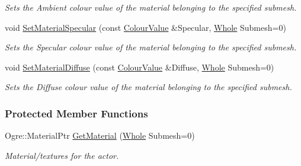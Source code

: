 \begin{DoxyCompactItemize}
\begin{DoxyCompactList}\small\item\em Sets the Ambient colour value of the material belonging to the specified submesh. \item\end{DoxyCompactList}\item 
void \hyperlink{classphys_1_1ActorGraphicsSettings_a51bfae72380679093595c1805b1d940b}{SetMaterialSpecular} (const \hyperlink{classphys_1_1ColourValue}{ColourValue} \&Specular, \hyperlink{namespacephys_a460f6bc24c8dd347b05e0366ae34f34a}{Whole} Submesh=0)
\begin{DoxyCompactList}\small\item\em Sets the Specular colour value of the material belonging to the specified submesh. \item\end{DoxyCompactList}\item 
void \hyperlink{classphys_1_1ActorGraphicsSettings_a135bebcafc6a2386aaec61bce7a5e548}{SetMaterialDiffuse} (const \hyperlink{classphys_1_1ColourValue}{ColourValue} \&Diffuse, \hyperlink{namespacephys_a460f6bc24c8dd347b05e0366ae34f34a}{Whole} Submesh=0)
\begin{DoxyCompactList}\small\item\em Sets the Diffuse colour value of the material belonging to the specified submesh. \item\end{DoxyCompactList}\end{DoxyCompactItemize}
\subsubsection*{Protected Member Functions}
\begin{DoxyCompactItemize}
\item 
\hypertarget{classphys_1_1ActorGraphicsSettings_ade1b760cc01187e9ffdeed8871533066}{
Ogre::MaterialPtr \hyperlink{classphys_1_1ActorGraphicsSettings_ade1b760cc01187e9ffdeed8871533066}{GetMaterial} (\hyperlink{namespacephys_a460f6bc24c8dd347b05e0366ae34f34a}{Whole} Submesh=0)}
\label{dd/dd6/classphys_1_1ActorGraphicsSettings_ade1b760cc01187e9ffdeed8871533066}

\begin{DoxyCompactList}\small\item\em Material/textures for the actor. \item\end{DoxyCompactList}\end{DoxyCompactItemize}
